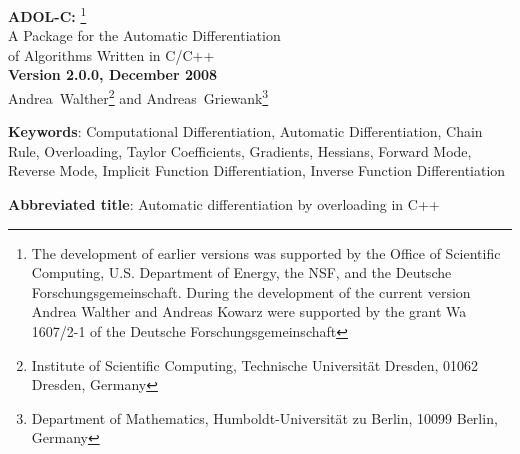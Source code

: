 \documentclass[11pt,twoside]{article}
\begin{document}
\begin{titlepage}
\begin{center}
{\Large {\bf ADOL-C:}} 
\footnote{The development of earlier versions was supported by the Office of
  Scientific Computing, U.S. Department of Energy, the NSF, and the Deutsche
  Forschungsgemeinschaft. During the development of the current
  version Andrea Walther and Andreas Kowarz were supported by the
  grant Wa 1607/2-1 of the Deutsche Forschungsgemeinschaft}  
\vspace{0.2in} \\
%
{\Large A Package for the Automatic Differentiation}\vspace{0.1in} \\
{\Large of Algorithms Written in C/C++}\\
\vspace{.2in}
{\large\bf  Version 2.0.0, December 2008} \\
\bigskip
 \mbox{Andrea Walther}\footnote{Institute of Scientific Computing, Technische
 Universit\"at Dresden, 01062 Dresden, Germany} and
 \mbox{Andreas Griewank}\footnote{Department of Mathematics,
 Humboldt-Universit\"at zu Berlin, 10099 Berlin, Germany}
\end{center}
%
\begin{abstract}
The C++ package ADOL-C described here facilitates the evaluation of
first and higher derivatives of vector functions that are defined
by computer programs written in C or C++. The resulting derivative
evaluation routines may be called from C, C++, Fortran, or any other
language that can be linked with C.

The numerical values of derivative vectors are obtained free
of truncation errors at a small multiple of the run time and
random access memory required by the given function evaluation program.
Derivative matrices are obtained by columns, by rows or in sparse format. 
For solution curves defined by ordinary differential equations,
special routines are provided that evaluate the Taylor coefficient vectors
and their Jacobians with respect to the current state vector.
For explicitly or implicitly defined functions derivative tensors are 
obtained with a complexity that grows only quadratically in their
degree. The derivative calculations involve a possibly substantial but
always predictable amount of data. Since the data is accessed strictly sequentially 
it can be automatically paged out to external files. 
\end{abstract}
%
{\bf Keywords}: Computational Differentiation, Automatic 
         Differentiation,
         Chain Rule, Overloading, Taylor Coefficients, 
         Gradients, Hessians, Forward Mode, Reverse Mode,
         Implicit Function Differentiation, Inverse Function Differentiation 
\medskip

\noindent
{\bf Abbreviated title}: Automatic differentiation by overloading in C++
%
\end{titlepage}
%
\tableofcontents       
%
\end{document}
